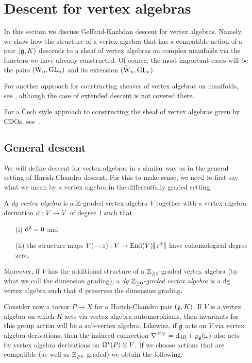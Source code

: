 \section{Descent for vertex algebras} \label{sec vertex desc}

In this section we discuss Gelfand-Kazhdan descent for vertex
algebras. Namely, we show how the structure of a vertex algebra that
has a compatible action of a pair $(\mathfrak g, K)$ descends to a sheaf of
vertex algebras on complex manifolds via the functors we have already
constructed. Of course, the most important cases will be the pairs
$({{\rm W}_n}, {\rm GL}_n)$ and its extension $(\widetilde{{{\rm W}}}_n, {\rm GL}_n)$. 

For another approach for constructing sheaves of vertex algebras on manifolds, 
see \cite{Malikov2008},  although the case of extended descent is not covered there. 

For a \v{C}ech style approach to constructing the sheaf of vertex
algebras given by CDOs, see~\cite{GMS2}. 

\subsection{General descent} 
\label{gendescent}

We will define descent for vertex algebras in a
similar way as in the general setting of Harish-Chandra descent. For this
to make sense, we need to first say what we mean by a vertex algebra
in the differentially graded setting. 

\begin{dfn} 
A {\em dg vertex algebra} is a $\mathbb Z$-graded vertex algebra $V$ 
together with a vertex algebra derivation ${\rm d} : V \to V$ of degree 1 such that
\begin{itemize}
\item[(i)] ${\rm d}^2 = 0$ and
\item[(ii)] the structure maps $Y(-; z) : V \to {\rm End}(V) \llbracket z^\pm \rrbracket$ have cohomological degree zero.
\end{itemize}
Moreover, if $V$ has the additional structure of a $\mathbb Z_{\geq 0}$-graded vertex algebra 
(by what we call the dimension grading), 
a {\em dg $\mathbb Z_{\geq 0}$-graded vertex algebra} is a dg vertex algebra such that
${\rm d}$ preserves the dimension grading. 
\end{dfn}

Consider now a torsor $P \to X$ for a Harish-Chandra pair $(\mathfrak g, K)$. 
If $V$ is a vertex algebra on which $K$ acts via vertex algebra automorphisms, 
then invariants for this group action will be a sub-vertex algebra. 
Likewise, if $\mathfrak g$ acts on $V$ via vertex algebra derivations,
then the induced connection $\nabla^{P,V} = {\rm d}_{dR} + \rho_\mathfrak g(\omega)$ also acts by vertex algebra derivations on $\Omega^*(P) \otimes V$. 
If we choose actions that are compatible (as well as $\mathbb Z_{\geq 0}$-graded) we
obtain the following. 

